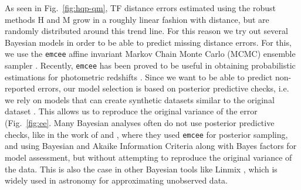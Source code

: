 \documentclass[a4paper,fleqn,usenatbib]{mnras}
\begin{document}
As seen in Fig.~\ref{fig:hqp-qm}, TF distance errors estimated using the robust methods H and M grow in a roughly linear fashion with distance, but are randomly distributed around this trend line. For this reason we try out several Bayesian models in order to be able to predict missing distance errors. For this, we use the \texttt{emcee} affine invariant Markov Chain Monte Carlo (MCMC) ensemble sampler \citep{emcee}. Recently, \texttt{emcee} has been proved to be useful in obtaining probabilistic estimations for photometric redshifts \citet{photred1,photred2}. Since we want to be able to predict non-reported errors, our model selection is based on posterior predictive checks, i.e. we rely on models that can create synthetic datasets similar to the original dataset \citep{gelmanppd}. This allows us to reproduce the original variance of the error (Fig.~\ref{fig:ee}. Many Bayesian analyses often do not use posterior predictive checks, like in the work of \citet{propprob2018} and \citet{bayesh}, where they used \texttt{emcee} for posterior sampling, and using Bayesian and Akaike Information Criteria along with Bayes factors for model assessment, but without attempting to reproduce the original variance of the data. This is also the case in other Bayesian tools like Linmix  \citep{gmastro}, which is widely used in astronomy for approximating unobserved data.  \\
\end{document}
